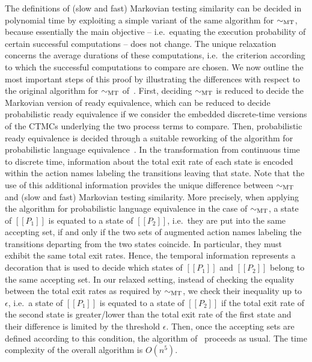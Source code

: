 \documentclass[copyright,creativecommons]{eptcs}
\newcommand{\lsp}
	{[ \! [}
\newcommand{\rsp}
	{] \! ]}
\newcommand{\sbis}[1]
	{\sim_{#1}}
\begin{document}
The definitions of (slow and fast) Markovian testing similarity can be decided in polynomial time by exploiting a simple 
variant of the same algorithm for $\sbis{\rm MT}$, because essentially the main objective -- i.e.\ equating the execution 
probability of certain successful computations -- does not change. The unique relaxation concerns the average durations of these 
computations, i.e.\ the criterion according to which the successful computations to compare are chosen.
We now outline the most important steps of this proof by illustrating the differences with respect to the original algorithm for
$\sbis{\rm MT}$ of~\cite{ABC}. First, deciding $\sbis{\rm MT}$ is reduced to decide the Markovian version 
of ready equivalence, which can be reduced to decide probabilistic ready equivalence if we consider the embedded discrete-time
versions of the CTMCs underlying the two process terms to compare. Then, probabilistic ready equivalence is decided through a 
suitable reworking of the algorithm for probabilistic language equivalence~\cite{Tzeng}. 
In the transformation from continuous time to discrete time, information about the total exit rate of each state is encoded 
within the action names labeling the transitions leaving that state. Note that the use of this additional information provides 
the unique difference between $\sbis{\rm MT}$ and (slow and fast) Markovian testing similarity. 
More precisely, when applying the algorithm for probabilistic language equivalence in the case of $\sbis{\rm MT}$, a state of 
$\lsp P_{1} \rsp$ is equated to a state of $\lsp P_{2} \rsp$, i.e.\ they are put into the same accepting set, if and only if 
the two sets of augmented action names labeling the transitions departing from the two states coincide. In particular, they must 
exhibit the same total exit rates. 
Hence, the temporal information represents a decoration that is used to decide which states of $\lsp P_{1} \rsp$ and 
$\lsp P_{2} \rsp$ belong to the same accepting set. In our relaxed setting, instead of checking the equality between the total 
exit rates as required by $\sbis{\rm MT}$, we check their inequality up to $\epsilon$, i.e.\ a state of $\lsp P_{1} \rsp$ is
equated to a state of $\lsp P_{2} \rsp$ if the total exit rate of the second state is greater/lower than the total exit rate of 
the first state and their difference is limited by the threshold $\epsilon$. 
Then, once the accepting sets are defined according to this condition, the algorithm of~\cite{Tzeng} proceeds as usual. 
The time complexity of the overall algorithm is $O(n^5)$.
\end{document}
